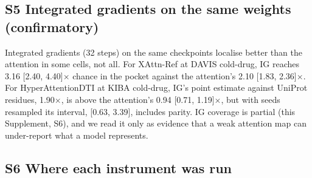 \documentclass[
  10pt,
]{article}
\begin{document}
\subsection{S5 Integrated gradients on the same weights (confirmatory)}\label{s5-integrated-gradients-on-the-same-weights-confirmatory}

Integrated gradients \citep{Sundararajan2017} (32 steps) on the same checkpoints localise better than the attention in some cells, not all. For XAttn-Ref at DAVIS cold-drug, IG reaches 3.16 {[}2.40, 4.40{]}$\times$ chance in the pocket against the attention's 2.10 {[}1.83, 2.36{]}$\times$. For HyperAttentionDTI at KIBA cold-drug, IG's point estimate against UniProt residues, 1.90$\times$, is above the attention's 0.94 {[}0.71, 1.19{]}$\times$, but with seeds resampled its interval, {[}0.63, 3.39{]}, includes parity. IG coverage is partial (this Supplement, S6), and we read it only as evidence that a weak attention map can under-report what a model represents.

\subsection{S6 Where each instrument was run}\label{s6-where-each-instrument-was-run}
\end{document}
